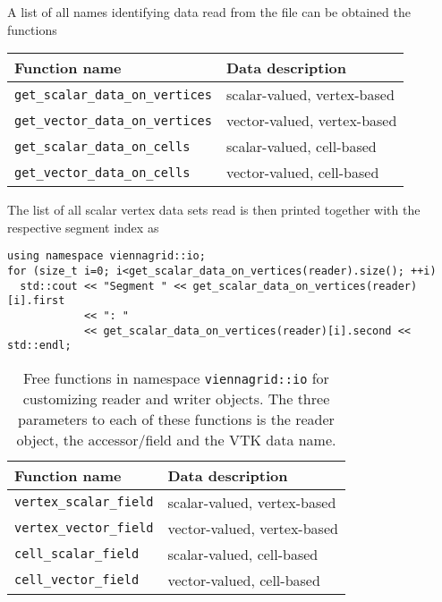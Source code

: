  A list of all names identifying data read from the file can be obtained the functions
 \begin{center}
  \begin{tabular}{|l|l|}
   \hline
   Function name & Data description \\
   \hline
   \lstinline|get_scalar_data_on_vertices| & scalar-valued, vertex-based \\
   \lstinline|get_vector_data_on_vertices| & vector-valued, vertex-based \\
   \hline
   \lstinline|get_scalar_data_on_cells| & scalar-valued, cell-based \\
   \lstinline|get_vector_data_on_cells| & vector-valued, cell-based \\
   \hline
  \end{tabular}
 \end{center}

 The list of all scalar vertex data sets read is then printed together with the respective segment index as
 \begin{lstlisting}
using namespace viennagrid::io;
for (size_t i=0; i<get_scalar_data_on_vertices(reader).size(); ++i)
  std::cout << "Segment " << get_scalar_data_on_vertices(reader)[i].first 
            << ": "
            << get_scalar_data_on_vertices(reader)[i].second << std::endl;
 \end{lstlisting}
 
  
 
 \begin{table}[tb]
 \begin{center}
  \begin{tabular}{|l|l|}
   \hline
   Function name & Data description \\
   \hline
   \lstinline|vertex_scalar_field| & scalar-valued, vertex-based \\
   \lstinline|vertex_vector_field| & vector-valued, vertex-based \\
   \hline
   \lstinline|cell_scalar_field| & scalar-valued, cell-based \\
   \lstinline|cell_vector_field| & vector-valued, cell-based \\
   \hline
  \end{tabular}
 \end{center}
 \caption{Free functions in namespace \lstinline|viennagrid::io| for customizing reader and writer objects. The three parameters to each of these functions is the reader object, the accessor/field and the VTK data name.}
 \label{tab:io-field-obtaining}
 \end{table}
 
